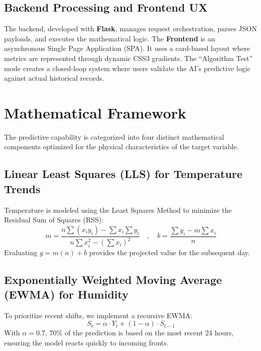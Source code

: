 \documentclass[14pt]{extarticle}
\begin{document}
\subsection{Backend Processing and Frontend UX}
The backend, developed with \textbf{Flask}, manages request orchestration, parses JSON payloads, and executes the mathematical logic. The \textbf{Frontend} is an asynchronous Single Page Application (SPA). It uses a card-based layout where metrics are represented through dynamic CSS3 gradients. The ``Algorithm Test'' mode creates a closed-loop system where users validate the AI's predictive logic against actual historical records.

\section{Mathematical Framework}
The predictive capability is categorized into four distinct mathematical components optimized for the physical characteristics of the target variable.

\subsection{Linear Least Squares (LLS) for Temperature Trends}
Temperature is modeled using the Least Squares Method to minimize the Residual Sum of Squares (RSS):
\begin{equation}
m = \frac{n\sum(x_iy_i) - \sum x_i \sum y_i}{n\sum x_i^2 - (\sum x_i)^2} \quad , \quad b = \frac{\sum y_i - m \sum x_i}{n}
\end{equation}
Evaluating $y = m(n) + b$ provides the projected value for the subsequent day.

\subsection{Exponentially Weighted Moving Average (EWMA) for Humidity}
To prioritize recent shifts, we implement a recursive EWMA:
\begin{equation}
S_t = \alpha \cdot Y_t + (1 - \alpha) \cdot S_{t-1}
\end{equation}
With $\alpha = 0.7$, 70\% of the prediction is based on the most recent 24 hours, ensuring the model reacts quickly to incoming fronts.
\end{document}
